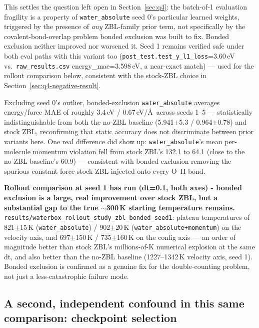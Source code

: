 \documentclass[11pt]{article}
\begin{document}
This settles the question left open in Section~\ref{sec:q4}: the batch-of-1
evaluation fragility is a property of \texttt{water\_absolute} seed 0's
particular learned weights, triggered by the presence of \emph{any}
ZBL-family prior term, not specifically by the covalent-bond-overlap problem
bonded exclusion was built to fix. Bonded exclusion neither improved nor
worsened it. Seed 1 remains verified safe under both eval paths with this
variant too (\texttt{post\_test.test\_y\_l1\_loss}=3.60\,eV vs.\
\texttt{raw\_results.csv} energy\_mae=3.598\,eV, a near-exact match) ---
used for the rollout comparison below, consistent with the stock-ZBL choice
in Section~\ref{sec:q4-negative-result}.

Excluding seed 0's outlier, bonded-exclusion \texttt{water\_absolute}
averages energy/force MAE of roughly 3.4\,eV / 0.67\,eV/\AA\ across seeds
1--5 --- statistically indistinguishable from both the no-ZBL baseline
(5.941$\pm$5.3 / 0.964$\pm$0.78) and stock ZBL, reconfirming that static
accuracy does not discriminate between prior variants here. One real
difference did show up: \texttt{water\_absolute}'s mean per-molecule
momentum violation fell from stock ZBL's 132.1 to 64.1 (close to the
no-ZBL baseline's 60.9) --- consistent with bonded exclusion removing the
spurious constant force stock ZBL injected onto every O--H bond.

\textbf{Rollout comparison at seed 1 has run (dt=0.1, both axes) - bonded
exclusion is a large, real improvement over stock ZBL, but a substantial
gap to the true $\sim$300\,K starting temperature remains.}
\texttt{results/waterbox\_rollout\_study\_zbl\_bonded\_seed1}: plateau
temperatures of 821$\pm$15\,K (\texttt{water\_absolute}) / 902$\pm$20\,K
(\texttt{water\_absolute+momentum}) on the velocity axis, and
697$\pm$150\,K / 735$\pm$160\,K on the config axis --- an order of
magnitude better than stock ZBL's millions-of-K numerical explosion at the
same dt, and also better than the no-ZBL baseline (1227--1342\,K velocity
axis, seed 1). Bonded exclusion is confirmed as a genuine fix for the
double-counting problem, not just a less-catastrophic failure mode.

\subsection{A second, independent confound in this same comparison: checkpoint selection}
\label{sec:q4-anneal-confound}
\end{document}
